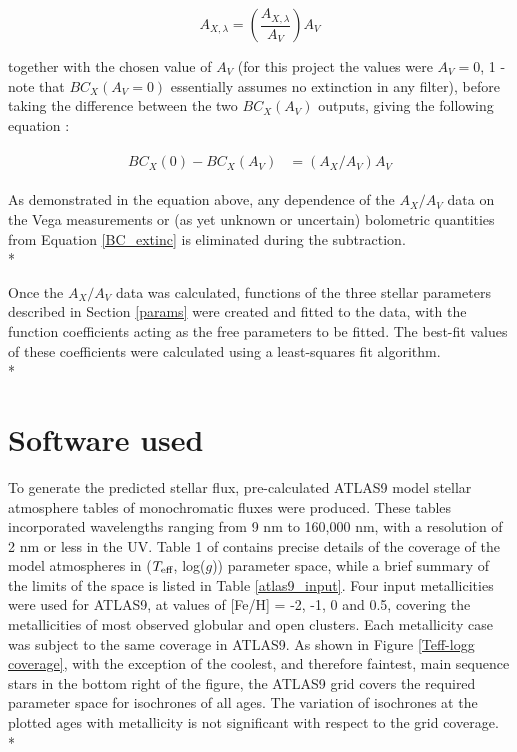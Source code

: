 \documentclass[12pt, a4paper]{report}
\begin{document}
\begin{equation}
A_{X,\lambda} = \left( \frac{A_{X,\lambda}}{A_{V}} \right) A_{V}
\label{ratio_eq}
\end{equation}

together with the chosen value of $A_{V}$ (for this project the values were $A_{V} = 0$, 1 - note that $BC_{X}(A_{V}=0)$ essentially assumes no extinction in any filter), before taking the difference between the two $BC_{X}(A_{V})$ outputs, giving the following equation \citep{2008PASP..120..583G}:

\begin{align}
\begin{split}
BC_{X}(0) - BC_{X}(A_{V}) &= \left(A_{X}/A_{V}\right)A_{V}
\label{BCs_diff}
\end{split}
\end{align}

As demonstrated in the equation above, any dependence of the $A_{X}/A_{V}$ data on the Vega measurements or (as yet unknown or uncertain) bolometric quantities from Equation \ref{BC_extinc} is eliminated during the subtraction. \\*

Once the $A_{X}/A_{V}$ data was calculated, functions of the three stellar parameters described in Section \ref{params} were created and fitted to the data, with the function coefficients acting as the free parameters to be fitted. The best-fit values of these coefficients were calculated using a least-squares fit algorithm.\\*

\section{Software used}
To generate the predicted stellar flux, pre-calculated ATLAS9 model stellar atmosphere \citep{1993KurCD..13.....K} tables of monochromatic fluxes were produced. These tables incorporated wavelengths ranging from 9 nm to 160,000 nm, with a resolution of 2 nm or less in the UV. Table 1 of \cite{2004astro.ph..5087C} contains precise details of the coverage of the model atmospheres in ($T_{\textnormal{eff}}$, log($g$)) parameter space, while a brief summary  of the limits of the space is listed in Table \ref{atlas9_input}. Four input metallicities were used for ATLAS9, at values of [Fe/H] = -2, -1, 0 and 0.5, covering the metallicities of most observed globular and open clusters. Each metallicity case was subject to the same coverage in ATLAS9. As shown in Figure \ref{Teff-logg coverage}, with the exception of the coolest, and therefore faintest, main sequence stars in the bottom right of the figure, the ATLAS9 grid covers the required parameter space for isochrones of all ages. The variation of isochrones at the plotted ages with metallicity is not significant with respect to the grid coverage. \\*
\end{document}
